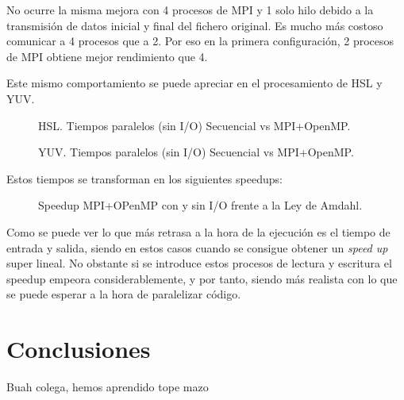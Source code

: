 \documentclass[12pt]{report} %
\begin{document}
No ocurre la misma mejora con 4 procesos de MPI y 1 solo hilo debido a la transmisión de datos inicial y
final del fichero original. Es mucho más costoso comunicar a 4 procesos que a 2. Por eso en la primera
configuración, 2 procesos de MPI obtiene mejor rendimiento que 4.

Este mismo comportamiento se puede apreciar en el procesamiento de HSL y YUV.

\begin{figure}[H]
	\makebox[\textwidth][c]{
        
    }
    \caption{HSL. Tiempos paralelos (sin I/O) Secuencial vs MPI+OpenMP.}
    \label{fig:hsl_tiempos}
\end{figure}

\begin{figure}[H]
	\makebox[\textwidth][c]{
        
    }
    \caption{YUV. Tiempos paralelos (sin I/O) Secuencial vs MPI+OpenMP.}
    \label{fig:yuv_tiempos}
\end{figure}

Estos tiempos se transforman en los siguientes speedups:

\begin{figure}[H]
	\makebox[\textwidth][c]{
        
    }
	\caption{Speedup MPI+OPenMP con y sin I/O frente a la Ley de Amdahl.}
    \label{fig:comparacion_speedup}
\end{figure}

Como se puede ver lo que más retrasa a la hora de la ejecución es el tiempo de entrada y salida, siendo en estos casos cuando se consigue obtener un \textit{speed up} super lineal. No obstante si se introduce estos procesos de lectura y escritura el speedup empeora considerablemente, y por tanto, siendo más realista con lo que se puede esperar a la hora de paralelizar código.


\chapter{Conclusiones}

Buah colega, hemos aprendido tope mazo


\nocite{*} %

\clearpage
{}
\printbibliography
\end{document}
